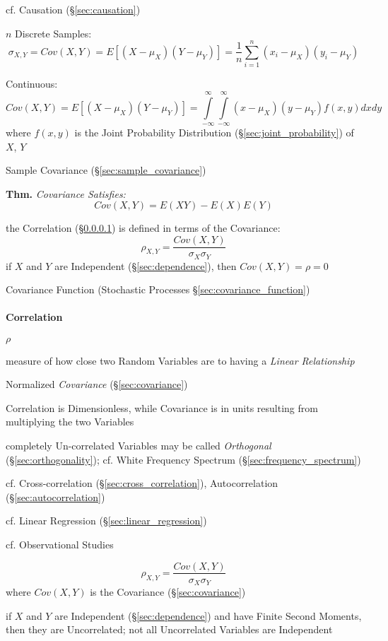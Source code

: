 \fist cf. Causation (\S\ref{sec:causation})

$n$ Discrete Samples:
\[
  \sigma_{X,Y} = Cov(X,Y) = E [(X - \mu_X)(Y - \mu_Y)] =
    \frac{1}{n} \sum_{i=1}^n (x_i - \mu_X) (y_i - \mu_Y)
\]

Continuous:
\[
  Cov(X,Y) = E [(X - \mu_X)(Y - \mu_Y)] =
  \int\limits_{-\infty}^{\infty} \int\limits_{-\infty}^{\infty}
  (x - \mu_X) (y - \mu_Y) f(x,y) dx dy
\]
where $f(x,y)$ is the Joint Probability Distribution
(\S\ref{sec:joint_probability}) of $X$, $Y$

\fist Sample Covariance (\S\ref{sec:sample_covariance})

\textbf{Thm.} \emph{Covariance Satisfies:
  \[
    Cov(X,Y) = E(XY) - E(X)E(Y)
  \]
}

the Correlation (\S\ref{sec:statistical_correlation}) is defined in terms of the
Covariance:
\[
  \rho_{X,Y} = \frac{Cov(X,Y)}{\sigma_X \sigma_Y}
\]
if $X$ and $Y$ are Independent (\S\ref{sec:dependence}), then
$Cov(X,Y) = \rho = 0$

\fist Covariance Function (Stochastic Processes \S\ref{sec:covariance_function})



\paragraph{Correlation}\label{sec:statistical_correlation}\hfill

$\rho$

measure of how close two Random Variables are to having a \emph{Linear
  Relationship}

Normalized \emph{Covariance} (\S\ref{sec:covariance})

Correlation is Dimensionless, while Covariance is in units resulting from
multiplying the two Variables

completely Un-correlated Variables may be called \emph{Orthogonal}
(\S\ref{sec:orthogonality}); cf. White Frequency Spectrum
(\S\ref{sec:frequency_spectrum})

\fist cf. Cross-correlation (\S\ref{sec:cross_correlation}), Autocorrelation
(\S\ref{sec:autocorrelation})

\fist cf. Linear Regression (\S\ref{sec:linear_regression})

cf. Observational Studies

\[
  \rho_{X,Y} = \frac{Cov(X,Y)}{\sigma_X \sigma_Y}
\]
where $Cov(X,Y)$ is the Covariance (\S\ref{sec:covariance})

if $X$ and $Y$ are Independent (\S\ref{sec:dependence}) and have Finite Second
Moments, then they are Uncorrelated; not all Uncorrelated Variables are
Independent

